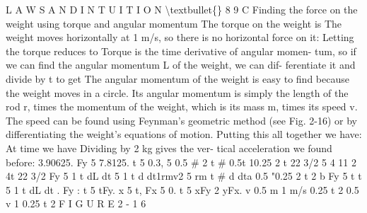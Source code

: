\documentclass[10pt,oneside]{article}
\begin{document}
L A W S  A N D  I N T U I T I O N \textbackslash{}textbullet\{\} 8 9 C Finding the force on the weight using torque and angular momentum The torque on the weight is The weight moves horizontally at 1 m/s, so there is no horizontal force on it: Letting the torque reduces to Torque is the time derivative of angular momen- tum, so if we can find the angular momentum L of the weight, we can dif- ferentiate it and divide by t to get The angular momentum of the weight is easy to find because the weight moves in a circle. Its angular momentum is simply the length of the rod r, times the momentum of the weight, which is its mass m, times its speed v. The speed can be found using Feynman’s geometric method (see Fig. 2-16) or by differentiating the weight’s equations of motion. Putting this all together we have: At time we have Dividing by 2 kg gives the ver- tical acceleration we found before: 3.90625. Fy 5 7.8125. t 5 0.3, 5 0.5 \# 2 t \# 0.5t 10.25 2 t 22 3/2 5 4 11 2 4t 22 3/2 Fy 5 1 t  dL dt 5 1 t  d dt1rmv2 5 rm t \# d dta 0.5 "0.25 2 t 2 b Fy 5 t t 5 1 t  dL dt . Fy : t 5 tFy. x 5 t, Fx 5 0. t 5 xFy 2 yFx. v 0.5 m 1 m/s 0.25  t 2 0.5 v 1 0.25  t 2 F I G U R E  2 - 1 6\par

\clearpage
{}
\end{document}
